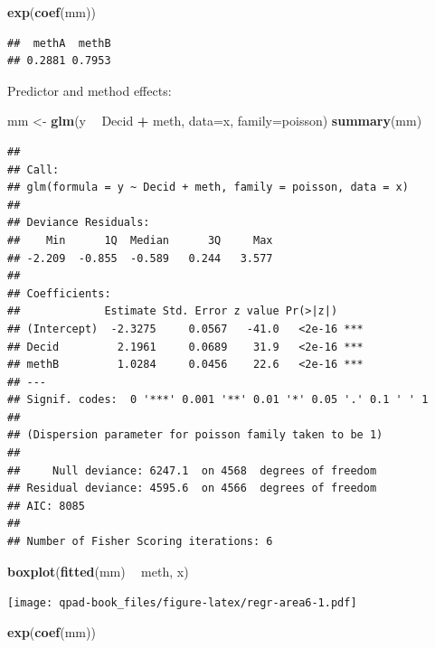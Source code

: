 \documentclass[12pt,]{book}
\newenvironment{Shaded}{\begin{snugshade}}{\end{snugshade}}
\newcommand{\DataTypeTok}[1]{\textcolor[rgb]{0.13,0.29,0.53}{#1}}
\newcommand{\KeywordTok}[1]{\textcolor[rgb]{0.13,0.29,0.53}{\textbf{#1}}}
\newcommand{\NormalTok}[1]{#1}
\newcommand{\OperatorTok}[1]{\textcolor[rgb]{0.81,0.36,0.00}{\textbf{#1}}}
\newcommand{\StringTok}[1]{\textcolor[rgb]{0.31,0.60,0.02}{#1}}
\begin{document}
\begin{Shaded}
\begin{Highlighting}[]
\KeywordTok{exp}\NormalTok{(}\KeywordTok{coef}\NormalTok{(mm))}
\end{Highlighting}
\end{Shaded}

\begin{verbatim}
##  methA  methB 
## 0.2881 0.7953
\end{verbatim}

Predictor and method effects:

\begin{Shaded}
\begin{Highlighting}[]
\NormalTok{mm <-}\StringTok{ }\KeywordTok{glm}\NormalTok{(y }\OperatorTok{~}\StringTok{ }\NormalTok{Decid }\OperatorTok{+}\StringTok{ }\NormalTok{meth, }\DataTypeTok{data=}\NormalTok{x, }\DataTypeTok{family=}\NormalTok{poisson)}
\KeywordTok{summary}\NormalTok{(mm)}
\end{Highlighting}
\end{Shaded}

\begin{verbatim}
## 
## Call:
## glm(formula = y ~ Decid + meth, family = poisson, data = x)
## 
## Deviance Residuals: 
##    Min      1Q  Median      3Q     Max  
## -2.209  -0.855  -0.589   0.244   3.577  
## 
## Coefficients:
##             Estimate Std. Error z value Pr(>|z|)    
## (Intercept)  -2.3275     0.0567   -41.0   <2e-16 ***
## Decid         2.1961     0.0689    31.9   <2e-16 ***
## methB         1.0284     0.0456    22.6   <2e-16 ***
## ---
## Signif. codes:  0 '***' 0.001 '**' 0.01 '*' 0.05 '.' 0.1 ' ' 1
## 
## (Dispersion parameter for poisson family taken to be 1)
## 
##     Null deviance: 6247.1  on 4568  degrees of freedom
## Residual deviance: 4595.6  on 4566  degrees of freedom
## AIC: 8085
## 
## Number of Fisher Scoring iterations: 6
\end{verbatim}

\begin{Shaded}
\begin{Highlighting}[]
\KeywordTok{boxplot}\NormalTok{(}\KeywordTok{fitted}\NormalTok{(mm) }\OperatorTok{~}\StringTok{ }\NormalTok{meth, x)}
\end{Highlighting}
\end{Shaded}

\texttt{[image: qpad-book\_files/figure-latex/regr-area6-1.pdf]}

\begin{Shaded}
\begin{Highlighting}[]
\KeywordTok{exp}\NormalTok{(}\KeywordTok{coef}\NormalTok{(mm))}
\end{Highlighting}
\end{Shaded}
\end{document}
